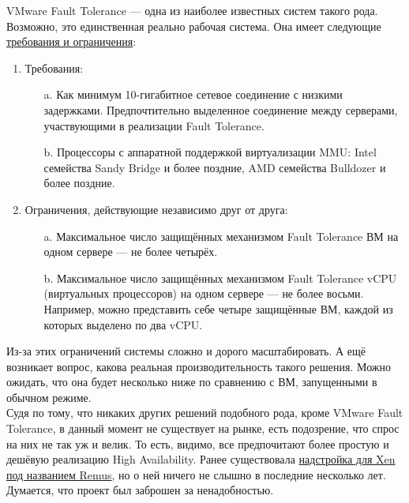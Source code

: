 \documentclass[14pt, a4paper]{article}
\begin{document}
VMware Fault Tolerance — одна из наиболее известных систем такого рода. Возможно, это
единственная реально рабочая система. Она имеет следующие \href{https://docs.vmware.com/en/VMware-vSphere/6.7/com.vmware.vsphere.avail.doc/GUID-57929CF0-DA9B-407A-BF2E-E7B72708D825.html}{требования и ограничения}:

\begin{enumerate}
    \item Требования:
    \begin{enumerate}
        \item[a.] Как минимум 10-гигабитное сетевое соединение с низкими задержками.
        Предпочтительно выделенное соединение между серверами, участвующими в
        реализации Fault Tolerance.
        \item[b.] Процессоры с аппаратной поддержкой виртуализации MMU: Intel семейства Sandy
        Bridge и более поздние, AMD семейства Bulldozer и более поздние.
    \end{enumerate}
    \item Ограничения, действующие независимо друг от друга:
    \begin{enumerate}
        \item[a.] Максимальное число защищённых механизмом Fault Tolerance ВМ на одном сервере
        — не более четырёх.
        \item[b.] Максимальное число защищённых механизмом Fault Tolerance vCPU (виртуальных
        процессоров) на одном сервере — не более восьми. Например, можно представить
        себе четыре защищённые ВМ, каждой из которых выделено по два vCPU.
    \end{enumerate}
\end{enumerate}

Из-за этих ограничений системы сложно и дорого масштабировать. А ещё возникает вопрос, какова
реальная производительность такого решения. Можно ожидать, что она будет несколько ниже по
сравнению с ВМ, запущенными в обычном режиме.\\

Судя по тому, что никаких других решений подобного рода, кроме VMware Fault Tolerance, в данный
момент не существует на рынке, есть подозрение, что спрос на них не так уж и велик. То есть, видимо,
все предпочитают более простую и дешёвую реализацию High Availability. Ранее существовала
\href{https://wiki.xenproject.org/wiki/Remus}{надстройка для Xen под названием Remus}, но о ней ничего не слышно в последние несколько лет.
Думается, что проект был заброшен за ненадобностью.
\end{document}
